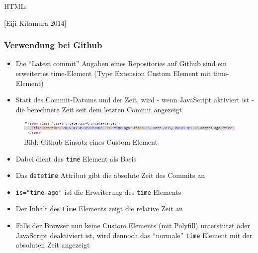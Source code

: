 HTML:

\begin{Shaded}
\begin{Highlighting}[]
  \KeywordTok{>}
\end{Highlighting}
\end{Shaded}

{[}Eiji Kitamura 2014{]}

\subsubsection{Verwendung bei Github}\label{verwendung-bei-github}

\begin{itemize}
\tightlist
\item
  Die ``Latest commit'' Angaben eines Repositories auf Github sind ein
  erweitertes time-Element (Type Extension Custom Element mit
  time-Element)
\item
  Statt des Commit-Datums und der Zeit, wird - wenn JavaScript aktiviert
  ist - die berechnete Zeit seit dem letzten Commit angezeigt
\end{itemize}

\begin{figure}[htbp]
\centering
\includegraphics{images/1-custom-elements-github-time-element.jpg}
\caption{Bild: Github Einsatz eines Custom Element}
\end{figure}

\begin{itemize}
\tightlist
\item
  Dabei dient das \texttt{time} Element als Basis
\item
  Das \texttt{datetime} Attribut gibt die absolute Zeit des Commits an
\item
  \texttt{is="time-ago"} ist die Erweiterung des \texttt{time} Elements
\item
  Der Inhalt des \texttt{time} Elements zeigt die relative Zeit an
\item
  Falls der Browser nun keine Custom Elements (mit Polyfill) unterstützt
  oder JavaScript deaktiviert ist, wird dennoch das ``normale''
  \texttt{time} Element mit der absoluten Zeit angezeigt
\end{itemize}

